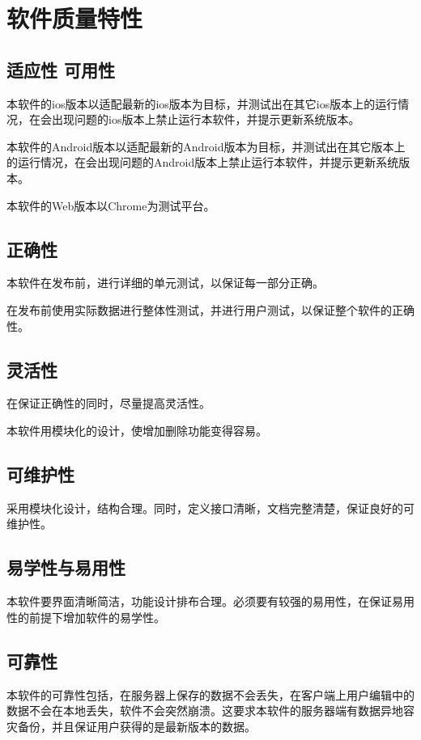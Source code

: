 \chapter{软件质量特性}
	\section{适应性 可用性}
	本软件的ios版本以适配最新的ios版本为目标，并测试出在其它ios版本上的运行情况，在会出现问题的ios版本上禁止运行本软件，并提示更新系统版本。

	本软件的Android版本以适配最新的Android版本为目标，并测试出在其它版本上的运行情况，在会出现问题的Android版本上禁止运行本软件，并提示更新系统版本。

	本软件的Web版本以Chrome为测试平台。
	\section{正确性}
	本软件在发布前，进行详细的单元测试，以保证每一部分正确。

	在发布前使用实际数据进行整体性测试，并进行用户测试，以保证整个软件的正确性。

	\section{灵活性}
	在保证正确性的同时，尽量提高灵活性。

	本软件用模块化的设计，使增加删除功能变得容易。

	\section{可维护性}
	采用模块化设计，结构合理。同时，定义接口清晰，文档完整清楚，保证良好的可维护性。

	\section{易学性与易用性}
	本软件要界面清晰简洁，功能设计排布合理。必须要有较强的易用性，在保证易用性的前提下增加软件的易学性。

	\section{可靠性}
	本软件的可靠性包括，在服务器上保存的数据不会丢失，在客户端上用户编辑中的数据不会在本地丢失，软件不会突然崩溃。这要求本软件的服务器端有数据异地容灾备份，并且保证用户获得的是最新版本的数据。
